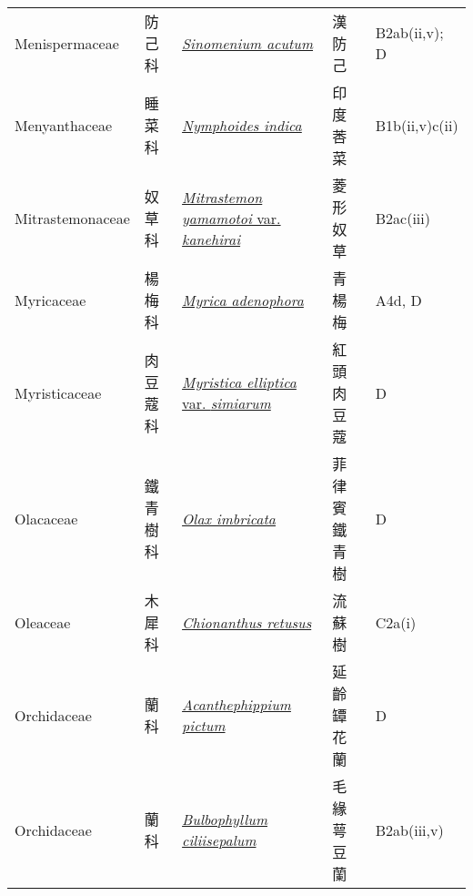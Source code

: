 {\begin{longtable}{L{2.5cm}L{2cm}L{5cm}L{2.5cm}L{3cm}}
    Menispermaceae & 防己科 & \href{http://www.theplantlist.org/tpl1.1/search?q=Sinomenium+acutum}{\textit{Sinomenium acutum} } & 漢防己 & B2ab(ii,v); D    \\
    Menyanthaceae & 睡菜科 & \href{http://www.theplantlist.org/tpl1.1/search?q=Nymphoides+indica}{\textit{Nymphoides indica} } & 印度莕菜 & B1b(ii,v)c(ii)    \\
    Mitrastemonaceae & 奴草科 & \href{http://www.theplantlist.org/tpl1.1/search?q=Mitrastemon+yamamotoi+var.+kanehirai}{\textit{Mitrastemon yamamotoi} var. \textit{kanehirai} } & 菱形奴草 & B2ac(iii)    \\
    Myricaceae & 楊梅科 & \href{http://www.theplantlist.org/tpl1.1/search?q=Myrica+adenophora}{\textit{Myrica adenophora} } & 青楊梅 & A4d, D    \\
    Myristicaceae & 肉豆蔻科 & \href{http://www.theplantlist.org/tpl1.1/search?q=Myristica+elliptica+var.+simiarum}{\textit{Myristica elliptica} var. \textit{simiarum} } & 紅頭肉豆蔻 & D    \\
    Olacaceae & 鐵青樹科 & \href{http://www.theplantlist.org/tpl1.1/search?q=Olax+imbricata}{\textit{Olax imbricata} } & 菲律賓鐵青樹 & D    \\
    Oleaceae & 木犀科 & \href{http://www.theplantlist.org/tpl1.1/search?q=Chionanthus+retusus}{\textit{Chionanthus retusus} } & 流蘇樹 & C2a(i)    \\
    Orchidaceae & 蘭科 & \href{http://www.theplantlist.org/tpl1.1/search?q=Acanthephippium+pictum}{\textit{Acanthephippium pictum} } & 延齡罈花蘭 & D    \\
    Orchidaceae & 蘭科 & \href{http://www.theplantlist.org/tpl1.1/search?q=Bulbophyllum+ciliisepalum}{\textit{Bulbophyllum ciliisepalum} } & 毛緣萼豆蘭 & B2ab(iii,v)    \\

\end{longtable}}
